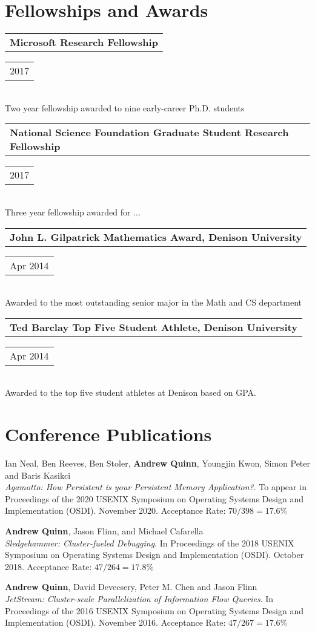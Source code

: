 \documentclass[letterpaper,10pt]{article}
\newcommand{\reitem}[2]{
  \begin{tabular}{l}
    #2
  \end{tabular}
\hfill
\begin{tabular}{r}
  #1
\end{tabular}
}
\newcommand{\award}[2]{\reitem{#1}{\textbf{#2}}}
\newcommand{\paper}[3]{#1\\#2 #3}
\newcommand{\desc}[1]{\hspace*{.5em}#1}
\begin{document}
\section{Fellowships and Awards}
\award{2017}{Microsoft Research Fellowship}\\
\desc{Two year fellowship awarded to nine early-career Ph.D. students}\\
\award{2017}{National Science Foundation Graduate Student Research Fellowship}\\
\desc{Three year fellowship awarded for ...}\\
\award{Apr 2014}{John L. Gilpatrick Mathematics Award, Denison University}\\
\desc{Awarded to the most outstanding senior major in the Math and CS department}
\award{Apr 2014}{Ted Barclay Top Five Student Athlete, Denison University}\\
\desc{Awarded to the top five student athletes at Denison based on GPA.}

\section{Conference Publications}
\paper{Ian Neal, Ben Reeves, Ben Stoler, \textbf{Andrew Quinn},
  Youngjin Kwon, Simon Peter and Baris Kasikci}{\emph{Agamotto: How
    Persistent is your Persistent Memory Application?}.  To appear in
  Proceedings of the 2020 USENIX Symposium on Operating Systems Design
  and Implementation (OSDI).  November 2020.}{Acceptance Rate: $70/398=17.6\%$}

\paper{\textbf{Andrew Quinn}, Jason Flinn, and Michael Cafarella}{
  \emph{Sledgehammer: Cluster-fueled Debugging}.  In Proceedings of
  the 2018 USENIX Symposium on Operating Systems Design and
  Implementation (OSDI).  October 2018.}{Acceptance Rate: $47/264 = 17.8\%$}

\paper{\textbf{Andrew Quinn}, David Devecsery, Peter M. Chen and Jason
  Flinn}{\emph{JetStream: Cluster-scale Parallelization of Information
  Flow Queries}.  In Proceedings of the 2016 USENIX Symposium on
    Operating Systems Design and Implementation (OSDI). November
  2016.}{Acceptance Rate: $47/267=17.6\%$}
\end{document}

